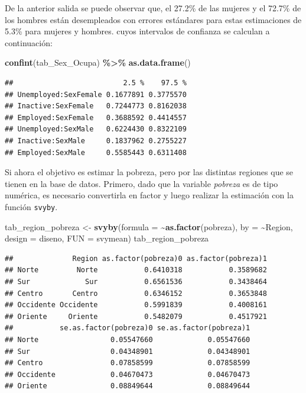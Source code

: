 \documentclass[
  spanish,
  12pt,
]{book}
\newenvironment{Shaded}{\begin{snugshade}}{\end{snugshade}}
\newcommand{\AttributeTok}[1]{\textcolor[rgb]{0.13,0.29,0.53}{#1}}
\newcommand{\FunctionTok}[1]{\textcolor[rgb]{0.13,0.29,0.53}{\textbf{#1}}}
\newcommand{\NormalTok}[1]{#1}
\newcommand{\OtherTok}[1]{\textcolor[rgb]{0.56,0.35,0.01}{#1}}
\newcommand{\SpecialCharTok}[1]{\textcolor[rgb]{0.81,0.36,0.00}{\textbf{#1}}}
\begin{document}
De la anterior salida se puede observar que, el 27.2\% de las mujeres y el 72.7\% de los hombres están desempleados con errores estándares para estas estimaciones de 5.3\% para mujeres y hombres. cuyos intervalos de confianza se calculan a continuación:

\begin{Shaded}
\begin{Highlighting}[]
\FunctionTok{confint}\NormalTok{(tab\_Sex\_Ocupa) }\SpecialCharTok{\%\textgreater{}\%} \FunctionTok{as.data.frame}\NormalTok{()}
\end{Highlighting}
\end{Shaded}

\begin{verbatim}
##                          2.5 %    97.5 %
## Unemployed:SexFemale 0.1677891 0.3775570
## Inactive:SexFemale   0.7244773 0.8162038
## Employed:SexFemale   0.3688592 0.4414557
## Unemployed:SexMale   0.6224430 0.8322109
## Inactive:SexMale     0.1837962 0.2755227
## Employed:SexMale     0.5585443 0.6311408
\end{verbatim}

Si ahora el objetivo es estimar la pobreza, pero por las distintas regiones que se tienen en la base de datos. Primero, dado que la variable \emph{pobreza} es de tipo numérica, es necesario convertirla en factor y luego realizar la estimación con la función \texttt{svyby}.

\begin{Shaded}
\begin{Highlighting}[]
\NormalTok{tab\_region\_pobreza }\OtherTok{\textless{}{-}} \FunctionTok{svyby}\NormalTok{(}\AttributeTok{formula =} \SpecialCharTok{\textasciitilde{}}\FunctionTok{as.factor}\NormalTok{(pobreza),  }\AttributeTok{by =} \SpecialCharTok{\textasciitilde{}}\NormalTok{Region, }
                            \AttributeTok{design =}\NormalTok{  diseno, }\AttributeTok{FUN =}\NormalTok{ svymean)}
\NormalTok{tab\_region\_pobreza}
\end{Highlighting}
\end{Shaded}

\begin{verbatim}
##              Region as.factor(pobreza)0 as.factor(pobreza)1
## Norte         Norte           0.6410318           0.3589682
## Sur             Sur           0.6561536           0.3438464
## Centro       Centro           0.6346152           0.3653848
## Occidente Occidente           0.5991839           0.4008161
## Oriente     Oriente           0.5482079           0.4517921
##           se.as.factor(pobreza)0 se.as.factor(pobreza)1
## Norte                 0.05547660             0.05547660
## Sur                   0.04348901             0.04348901
## Centro                0.07858599             0.07858599
## Occidente             0.04670473             0.04670473
## Oriente               0.08849644             0.08849644
\end{verbatim}
\end{document}

